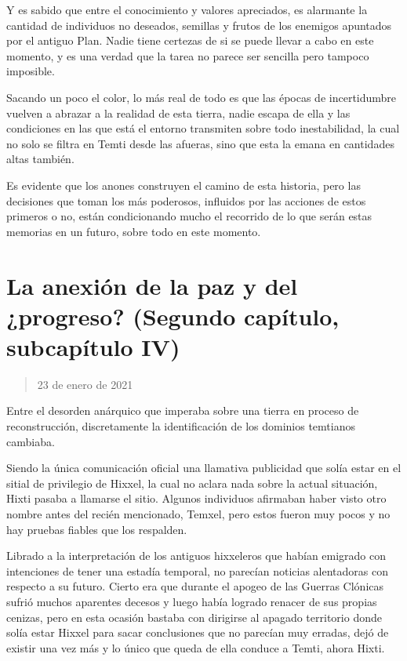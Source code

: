 \documentclass[
  spanish,
]{book}
\begin{document}
Y es sabido que entre el conocimiento y valores apreciados, es alarmante la cantidad de individuos no deseados, semillas y frutos de los enemigos apuntados por el antiguo Plan. Nadie tiene certezas de si se puede llevar a cabo en este momento, y es una verdad que la tarea no parece ser sencilla pero tampoco imposible.

Sacando un poco el color, lo más real de todo es que las épocas de incertidumbre vuelven a abrazar a la realidad de esta tierra, nadie escapa de ella y las condiciones en las que está el entorno transmiten sobre todo inestabilidad, la cual no solo se filtra en Temti desde las afueras, sino que esta la emana en cantidades altas también.

Es evidente que los anones construyen el camino de esta historia, pero las decisiones que toman los más poderosos, influidos por las acciones de estos primeros o no, están condicionando mucho el recorrido de lo que serán estas memorias en un futuro, sobre todo en este momento.

\hypertarget{la-anexiuxf3n-de-la-paz-y-del-progreso-segundo-capuxedtulo-subcapuxedtulo-iv}{%
\section{La anexión de la paz y del ¿progreso? (Segundo capítulo, subcapítulo IV)}\label{la-anexiuxf3n-de-la-paz-y-del-progreso-segundo-capuxedtulo-subcapuxedtulo-iv}}

\begin{quote}
23 de enero de 2021
\end{quote}

Entre el desorden anárquico que imperaba sobre una tierra en proceso de reconstrucción, discretamente la identificación de los dominios temtianos cambiaba.

Siendo la única comunicación oficial una llamativa publicidad que solía estar en el sitial de privilegio de Hixxel, la cual no aclara nada sobre la actual situación, Hixti pasaba a llamarse el sitio. Algunos individuos afirmaban haber visto otro nombre antes del recién mencionado, Temxel, pero estos fueron muy pocos y no hay pruebas fiables que los respalden.

Librado a la interpretación de los antiguos hixxeleros que habían emigrado con intenciones de tener una estadía temporal, no parecían noticias alentadoras con respecto a su futuro. Cierto era que durante el apogeo de las Guerras Clónicas sufrió muchos aparentes decesos y luego había logrado renacer de sus propias cenizas, pero en esta ocasión bastaba con dirigirse al apagado territorio donde solía estar Hixxel para sacar conclusiones que no parecían muy erradas, dejó de existir una vez más y lo único que queda de ella conduce a Temti, ahora Hixti.
\end{document}
